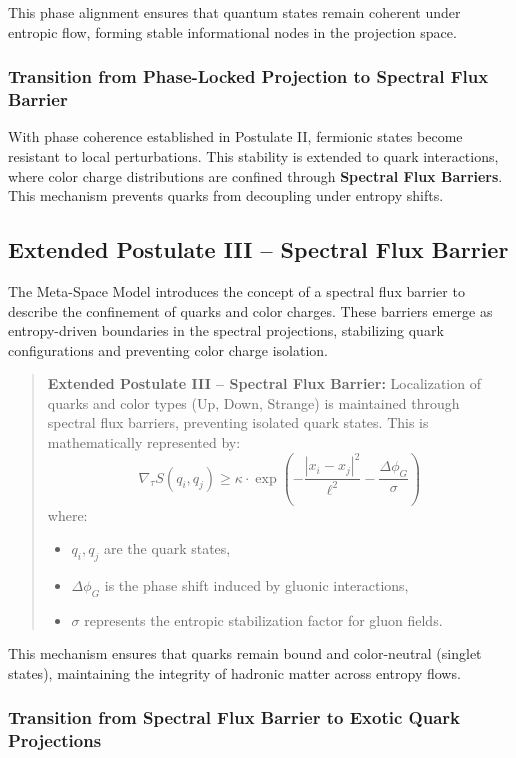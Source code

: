 \documentclass[10.5pt,a4paper]{article}
\begin{document}
This phase alignment ensures that quantum states remain coherent under entropic flow, forming stable 
informational nodes in the projection space.

\subsubsection*{Transition from Phase-Locked Projection to Spectral Flux Barrier}

With phase coherence established in Postulate II, fermionic states become resistant to local perturbations. 
This stability is extended to quark interactions, where color charge distributions are confined through 
\textbf{Spectral Flux Barriers}. This mechanism prevents quarks from decoupling under entropy shifts.

\subsection{Extended Postulate III – Spectral Flux Barrier}

The Meta-Space Model introduces the concept of a spectral flux barrier to describe the confinement of quarks 
and color charges. These barriers emerge as entropy-driven boundaries in the spectral projections, stabilizing 
quark configurations and preventing color charge isolation.

\begin{quote}
\textbf{Extended Postulate III – Spectral Flux Barrier:}  
Localization of quarks and color types (Up, Down, Strange) is maintained through spectral flux barriers, 
preventing isolated quark states. This is mathematically represented by:
\[
\nabla_\tau S(q_i, q_j) \geq \kappa \cdot \exp\left(-\frac{|x_i - x_j|^2}{\ell^2} - \frac{\Delta \phi_G}{\sigma}\right)
\]
where:
\begin{itemize}
    \item \( q_i, q_j \) are the quark states,
    \item \( \Delta \phi_G \) is the phase shift induced by gluonic interactions,
    \item \( \sigma \) represents the entropic stabilization factor for gluon fields.
\end{itemize}
\end{quote}

This mechanism ensures that quarks remain bound and color-neutral (singlet states), maintaining the integrity 
of hadronic matter across entropy flows.

\subsubsection*{Transition from Spectral Flux Barrier to Exotic Quark Projections}
\end{document}
